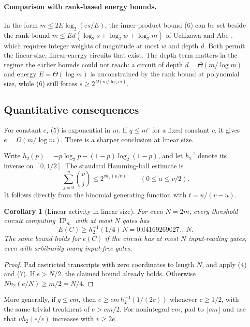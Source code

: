 \documentclass[11pt]{article}
\newtheorem{corollary}[theorem]{Corollary}
\theoremstyle{definition}
\newcommand{\ip}{\operatorname{IP}}
\newcommand{\Eul}{\mathrm e}
\begin{document}
\paragraph{Comparison with rank-based energy bounds.}
In the form \(m\le2E\log_2(\Eul s/E)\), the inner-product bound (6) can be set beside the rank bound \(m\le Ed(\log_2s+\log_2w+\log_2m)\) of Uchizawa and Abe \cite{UA23}, which requires integer weights of magnitude at most \(w\) and depth \(d\). Both permit the linear-size, linear-energy circuits that exist. The depth term matters in the regime the earlier bounds could not reach: a circuit of depth \(d=\Theta(m/\log m)\) and energy \(E=\Theta(\log m)\) is unconstrained by the rank bound at polynomial size, while (6) still forces \(s\ge2^{\Omega(m/\log m)}\).

\subsection{Quantitative consequences}
For constant \(e\), (5) is exponential in \(m\). If \(q\le m^c\) for a fixed constant \(c\), it gives \(e=\Omega(m/\log m)\).
There is a sharper conclusion at linear size.

Write \(h_2(p)=-p\log_2p-(1-p)\log_2(1-p)\), and let \(h_2^{-1}\) denote its inverse on \([0,1/2]\). The standard Hamming-ball estimate is
\[
 \sum_{j=0}^{u}\binom vj\le2^{v h_2(u/v)}
 \qquad(0\le u\le v/2).                                  \tag{7}
\]
It follows directly from the binomial generating function with \(t=u/(v-u)\).

\begin{corollary}[Linear activity in linear size]\label{cor:linearenergy}
For even \(N=2m\), every threshold circuit computing \(\ip_m\) with at most \(N\) gates has
\[
 E(C)\ge h_2^{-1}(1/4)\,N
       =0.04169269027\ldots\,N.
\]
The same bound holds for \(e(C)\) if the circuit has at most \(N\) input-reading gates, even with arbitrarily many input-free gates.
\end{corollary}
\begin{proof}
Pad restricted transcripts with zero coordinates to length \(N\), and apply (4) and (7).
If \(e>N/2\), the claimed bound already holds. Otherwise
\(N h_2(e/N)\ge m/2=N/4\).
\end{proof}

More generally, if \(q\le c m\), then \(e\ge c m\,h_2^{-1}(1/(2c))\) whenever \(c\ge1/2\), with the same trivial treatment of \(e>cm/2\). For nonintegral \(cm\), pad to \(\lfloor cm\rfloor\) and use that \(v h_2(e/v)\) increases with \(v\ge2e\).
\end{document}
